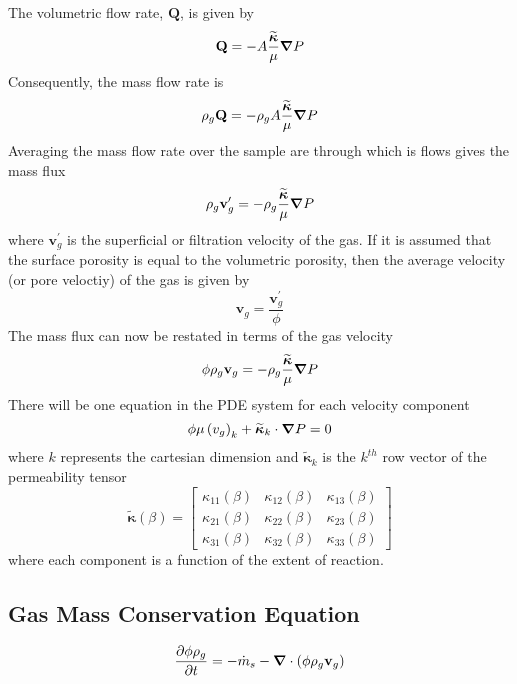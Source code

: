 The volumetric flow rate, $\textbf{Q}$, is given by
\begin{equation}
  \textbf{Q} = -A \frac{\widetilde{\boldsymbol{\kappa}}}{\mu}{\boldsymbol{\nabla}} {P}
\end{equation} 
Consequently, the mass flow rate is
\begin{equation}
  \rho_{g} \textbf{Q} = - \rho_{g} A \frac{\widetilde{\boldsymbol{\kappa}}}{\mu}{\boldsymbol{\nabla}} {P}
\end{equation} 
Averaging the mass flow rate over the sample are through which is flows gives the mass flux
\begin{equation}
  \rho_{g} \textbf{v}_{g}^{\prime} = - \rho_{g} \frac{\widetilde{\boldsymbol{\kappa}}}{\mu}{\boldsymbol{\nabla}} {P}
\end{equation} 
where $\textbf{v}_{g}^{\prime}$ is the superficial or filtration velocity of the gas.  If it is assumed that the surface porosity is equal to the volumetric porosity, then the average velocity (or pore veloctiy) of the gas is given by
\begin{equation}
 \textbf{v}_{g} = \frac{\textbf{v}_{g}^{\prime}}{\phi}
\end{equation}
The mass flux can now be restated in terms of the gas velocity
\begin{equation}
  \phi \rho_{g} \textbf{v}_{g} = - \rho_{g} \frac{\widetilde{\boldsymbol{\kappa}}}{\mu}{\boldsymbol{\nabla}} {P}
\end{equation} 
There will be one equation in the PDE system for each velocity component
\begin{equation}
  \phi \mu \left(v_{g}\right)_{k} + \widetilde{\boldsymbol{\kappa}}_{k} \cdot {\boldsymbol{\nabla}} {P} = 0
\end{equation} 
where $k$ represents the cartesian dimension and $\widetilde{\boldsymbol{\kappa}}_{k}$ is the $k^{th}$ row vector of the permeability tensor
\begin{equation}
\widetilde{\boldsymbol{\kappa}}\left(\beta\right) = \left[ \begin{matrix}
\kappa_{11}\left(\beta\right) & \kappa_{12}\left(\beta\right) & \kappa_{13}\left(\beta\right) \\
\kappa_{21}\left(\beta\right) & \kappa_{22}\left(\beta\right) & \kappa_{23}\left(\beta\right) \\
\kappa_{31}\left(\beta\right) & \kappa_{32}\left(\beta\right) & \kappa_{33}\left(\beta\right) \end{matrix} \right]
\end{equation}
where each component is a function of the extent of reaction.
\subsection{Gas Mass Conservation Equation}
\begin{equation}
  {\frac{\partial{\phi \rho_g}}{\partial{t}}} = - \dot{m}_s - {\boldsymbol{\nabla}} {}\cdot\left(\phi \rho_g \textbf{v}_g \right)
\end{equation}



